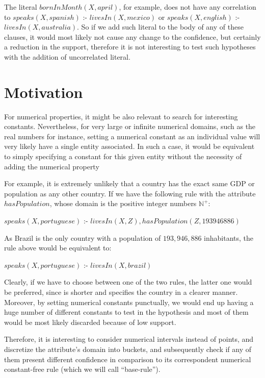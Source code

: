 The literal $bornInMonth(X,april)$, for example, does not have any correlation  to $speaks(X,spanish )$ :-
$livesIn(X,mexico)$ or $speaks(X,english)$ :- $livesIn(X,australia)$. So if we add such literal to the body of any of
these clauses, it would most likely not cause any change to the confidence,  but certainly a reduction in the support,
therefore it is not interesting to test such hypotheses with the addition of uncorrelated literal.


\section{Motivation}

For numerical properties, it might be also relevant to search for interesting constants. Nevertheless, for very large
or infinite numerical domains, such as the real numbers for instance, setting a numerical constant as an individual
value will very likely have a single entity associated. In such a case, it would be equivalent to simply
specifying a constant for this given entity without the necessity of adding the numerical property

For example, it is extremely unlikely that a country has the exact same GDP or population as any other country. If we
have the following rule with the attribute $hasPopulation$, whose domain is the positive integer numbers
$\mathbb{N}^+$:

\begin{center}
 $speaks(X,portuguese)$ :- $livesIn(X,Z),hasPopulation(Z,193946886)$
\end{center}

As Brazil is the only country with a population of $193,946,886$ inhabitants, the rule above would be equivalent to:

\begin{center}
 $speaks(X,portuguese)$ :- $livesIn(X,brazil)$
\end{center}

Clearly, if we have to choose between one of the two rules, the latter one would be preferred, since is shorter and
specifies the country in a clearer manner. Moreover, by setting numerical constants punctually, we would end up having a
huge number of different constants to test in the hypothesis and most of them would be most likely discarded because of
low support.

Therefore, it is interesting to consider numerical intervals instead of points, and discretize the attribute's domain
into buckets, and subsequently check if any of them present different confidence in comparison to its
correspondent numerical constant-free rule (which we will call ``base-rule'').

